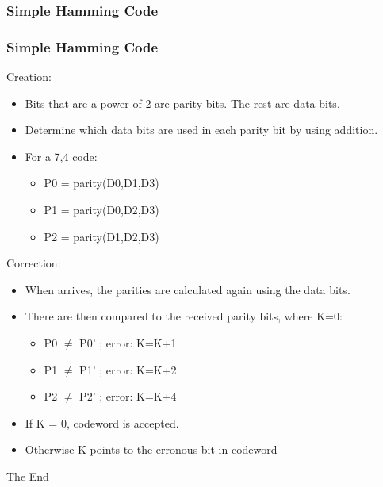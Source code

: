 \documentclass{beamer}
\begin{document}
\subsubsection{Simple Hamming Code}
\begin{frame}
\frametitle{Simple Hamming Code}
Creation:
\begin{itemize}
\item Bits that are a power of 2 are parity bits. The rest are data bits.
\item Determine which data bits are used in each parity bit by using addition.
\item For a 7,4 code:
\begin{itemize}
\item P0 = parity(D0,D1,D3)
\item P1 = parity(D0,D2,D3)
\item P2 = parity(D1,D2,D3)
\end{itemize}
\end{itemize}
Correction:
\begin{itemize}
\item When arrives, the parities are calculated again using the data bits.
\item There are then compared to the received parity bits, where K=0:
\begin{itemize}
\item P0 $\neq$ P0' ; error: K=K+1
\item P1 $\neq$ P1' ; error: K=K+2
\item P2 $\neq$ P2' ; error: K=K+4
\end{itemize}
\item If K = 0, codeword is accepted.
\item Otherwise K points to the erronous bit in codeword
\end{itemize}
\end{frame}
\begin{frame} 
\Huge{\centerline{The End}}
\end{frame}
\end{document}
